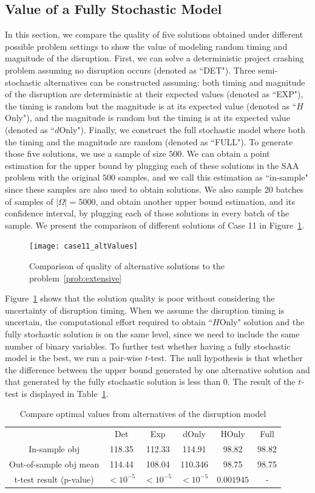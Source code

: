 \documentclass[11pt]{article}
\begin{document}
	\subsection{Value of a Fully Stochastic Model} \label{subsec:value}
	In this section, we compare the quality of five solutions obtained under different possible problem settings to show the value of modeling random timing and magnitude of the disruption. First, we can solve a deterministic project crashing problem assuming no disruption occurs (denoted as ``DET"). Three semi-stochastic alternatives can be constructed assuming: both timing and magnitude of the disruption are deterministic at their expected values (denoted as ``EXP"), the timing is random but the magnitude is at its expected value (denoted as ``\(H\)Only"), and the magnitude is random but the timing is at its expected value (denoted as ``\(d\)Only"). Finally, we construct the full stochastic model where both the timing and the magnitude are random (denoted as ``FULL"). To generate those five solutions, we use a sample of size \(500\). We can obtain a point estimation for the upper bound by plugging each of these solutions in the SAA problem with the original \(500\) samples, and we call this estimation as ``in-sample" since these samples are also used to obtain solutions. We also sample 20 batches of samples of \(|\Omega| = 5000\), and obtain another upper bound estimation, and its confidence interval, by plugging each of those solutions in every batch of the sample. We present the comparison of different solutions of Case 11 in Figure~\ref{fig:value}.
	\begin{figure}[H]
		\centering
		\texttt{[image: case11\_altValues]}
		\caption{Comparison of quality of alternative solutions to the problem~\eqref{prob:extensive}}
		\label{fig:value}
	\end{figure}
	Figure~\ref{fig:value} shows that the solution quality is poor without considering the uncertainty of disruption timing. When we assume the disruption timing is uncertain, the computational effort required to obtain ``\(H\)Only" solution and the fully stochastic solution is on the same level, since we need to include the same number of binary variables. To further test whether having a fully stochastic model is the best, we run a pair-wise \(t\)-test. The null hypothesis is that whether the difference between the upper bound generated by one alternative solution and that generated by the fully stochastic solution is less than 0. The result of the \(t\)-test is displayed in Table~\ref{table:value}.
	\begin{table}[H]
		\centering
		\begin{tabular}{c c c c c c}
			\hline
			& Det & Exp & dOnly & HOnly & Full\\
			In-sample obj & 118.35 & 112.33 & 114.91 & 98.82 & 98.82 \\
			Out-of-sample obj mean & 114.44 & 108.04 & 110.346 & 98.75 & 98.75 \\
			t-test result (p-value) & \(< 10^{-5}\) & \(< 10^{-5}\)& \(< 10^{-5}\)&  \(0.001945\)& -\\
			\hline
		\end{tabular}
		\caption{Compare optimal values from alternatives of the disruption model}
		\label{table:value}
	\end{table}
\end{document}
